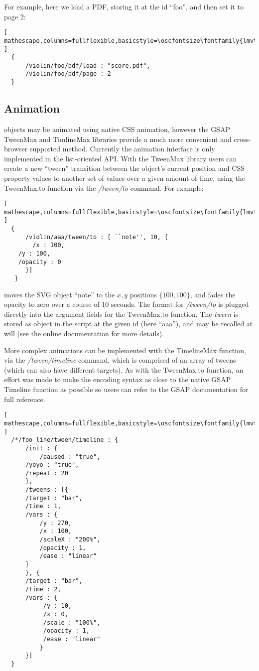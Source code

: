 For example, here we load a PDF, storing it at the \drawsocket id ``foo'', and then set it to page 2:

\begin{lstlisting}[ mathescape,columns=fullflexible,basicstyle=\oscfontsize\fontfamily{lmvtt}\selectfont ]
  {
      /violin/foo/pdf/load : "score.pdf",
      /violin/foo/pdf/page : 2
  }
 \end{lstlisting}


\subsection{Animation}\label{sec:animation}
\drawsocket objects may be animated using native CSS animation, however the GSAP TweenMax and TimlineMax libraries provide a much more convenient and cross-browser supported method.
Currently the \drawsocket animation interface is only implemented in the list-oriented API.
With the TweenMax library users can create a new ``tween'' transition between the object's current position and CSS property values to another set of values over a given amount of time, using the TweenMax.to function via the \textit{/tween/to} \drawsocket command. For example:
\begin{lstlisting}[ mathescape,columns=fullflexible,basicstyle=\oscfontsize\fontfamily{lmvtt}\selectfont ]
  {
      /violin/aaa/tween/to : [ ``note'', 10, {
      	/x : 100,
	/y : 100,
	/opacity : 0
      }]
   }
 \end{lstlisting}
\noindent
moves the SVG object ``note'' to the ${x,y}$ positions $\{100,100\}$, and fades the opacity to zero over a course of 10 seconds.
The format for \textit{/tween/to} is plugged directly into the argument fields for the TweenMax.to function.
The \textit{tween} is stored as object in the \drawsocket script at the given id (here ``aaa''), and may be recalled at will (see the online documentation for more details).

More complex animations can be implemented with the TimelineMax function, via the \drawsocket \textit{/tween/timeline} command, which is comprised of an array of tweens (which can also have different targets).
As with the TweenMax.to function, an effort was made to make the encoding syntax as close to the native GSAP Timeline function as possible so users can refer to the GSAP documentation for full reference.

\begin{minipage}{\linewidth}
\begin{lstlisting}[ mathescape,columns=fullflexible,basicstyle=\oscfontsize\fontfamily{lmvtt}\selectfont ]
  /*/foo_line/tween/timeline : {
      /init : {
          /paused : "true",
	  /yoyo : "true",
	  /repeat : 20
      },
      /tweens : [{
	  /target : "bar",
	  /time : 1,
	  /vars : {
	      /y : 270,
	      /x : 100,
	      /scaleX : "200%",
	      /opacity : 1,
	      /ease : "linear"
	  }
      }, {
	  /target : "bar",
	  /time : 2,
	  /vars : {
	       /y : 10,
	       /x : 0,
	       /scale : "100%",
	       /opacity : 1,
	       /ease : "linear"
      	  }
      }]
  }
\end{lstlisting}
\end{minipage}

